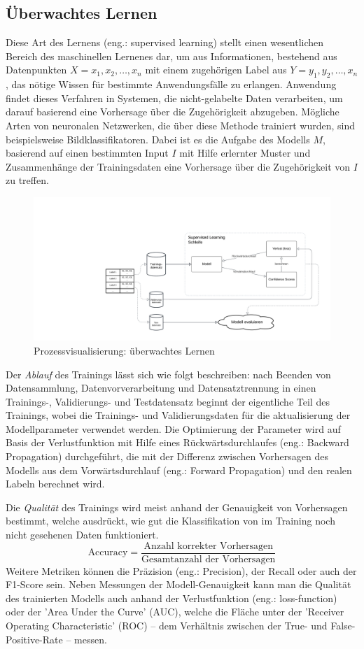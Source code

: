 \subsection{Überwachtes Lernen}\label{subsec:supervisedlearning}
Diese Art des Lernens (eng.: supervised learning) stellt einen wesentlichen Bereich des maschinellen Lernenes dar, um aus Informationen, bestehend aus Datenpunkten \textit{$X = x_1, x_2, \ldots, x_n$} mit einem zugehörigen Label aus \textit{$Y = y_1, y_2, \ldots, x_n$}, das nötige Wissen für bestimmte Anwendungsfälle zu erlangen. Anwendung findet dieses Verfahren in Systemen, die nicht-gelabelte Daten verarbeiten, um darauf basierend eine Vorhersage über die Zugehörigkeit abzugeben.
Mögliche Arten von neuronalen Netzwerken, die über diese Methode trainiert wurden, sind beispielsweise Bildklassifikatoren. Dabei ist es die Aufgabe des Modells $M$, basierend auf einen bestimmten Input $I$ mit Hilfe erlernter Muster und Zusammenhänge der Trainingsdaten eine Vorhersage über die Zugehörigkeit von $I$ zu treffen.
\begin{figure}[H]
	\hspace{-30mm}
	\centering
	\includegraphics[width=0.8\linewidth]{Bilder/SupervisedLearning.png}
	\caption{Prozessvisualisierung: überwachtes Lernen}
\end{figure}
Der \textit{Ablauf} des Trainings lässt sich wie folgt beschreiben: nach Beenden von Datensammlung, Datenvorverarbeitung und Datensatztrennung in einen Trainings-, Validierungs- und Testdatensatz beginnt der eigentliche Teil des Trainings, wobei die Trainings- und Validierungsdaten für die aktualisierung der Modellparameter verwendet werden. Die Optimierung der Parameter wird auf Basis der Verlustfunktion mit Hilfe eines Rückwärtsdurchlaufes (eng.: Backward Propagation) durchgeführt, die mit der Differenz zwischen Vorhersagen des Modells aus dem Vorwärtsdurchlauf (eng.: Forward Propagation) und den realen Labeln berechnet wird.

Die \textit{Qualität} des Trainings wird meist anhand der Genauigkeit von Vorhersagen bestimmt, welche ausdrückt, wie gut die Klassifikation von im Training noch nicht gesehenen Daten funktioniert.
\[
\text{Accuracy} = \frac{\text{Anzahl korrekter Vorhersagen}}{\text{Gesamtanzahl der Vorhersagen}}
\]
 Weitere Metriken können die Präzision (eng.: Precision), der Recall oder auch der F1-Score sein. Neben Messungen der Modell-Genauigkeit kann man die Qualität des trainierten Modells auch anhand der Verlustfunktion (eng.: loss-function) oder der 'Area Under the Curve' (AUC), welche die Fläche unter der 'Receiver Operating Characteristic' (ROC) -- dem Verhältnis zwischen der True- und False-Positive-Rate -- messen.
